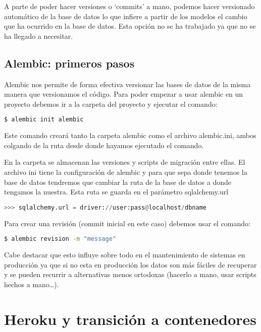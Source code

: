 A parte de poder hacer versiones o `commits' a mano, podemos hacer versionado automático de la base de datos lo que infiere a partir de los modelos el cambio que ha ocurrido en la base de datos. Esta opción no se ha trabajado ya que no se ha llegado a necesitar.

\subsection{Alembic: primeros pasos}

Alembic nos permite de forma efectiva versionar las bases de datos de la misma manera que versionamos el código. Para poder empezar a usar alembic en un proyecto debemos ir a la carpeta del proyecto y ejecutar el comando:

\begin{lstlisting}[language=bash]
  $ alembic init alembic
\end{lstlisting}

Este comando creará tanto la carpeta alembic como el archivo alembic.ini, ambos colgando de la ruta desde donde hayamos ejecutado el comando. 

En la carpeta se almacenan las versiones y scripts de migración entre ellas. El archivo ini tiene la configuración de alembic y para que sepa donde tenemos la base de datos tendremos que cambiar la ruta de la base de datos a donde tengamos la nuestra. Esta ruta se guarda en el parámetro sqlalchemy.url

\begin{lstlisting}[language=python]
  >>> sqlalchemy.url = driver://user:pass@localhost/dbname
\end{lstlisting}



Para crear una revisión (commit inicial en este caso) debemos usar el comando:

\begin{lstlisting}[language=bash]
  $ alembic revision -m "message"
\end{lstlisting}

Cabe destacar que esto influye sobre todo en el mantenimiento de sistemas en producción ya que si no esta en producción los datos son más fáciles de recuperar y se pueden recurrir a alternativas menos ortodoxas (hacerlo a mano, usar scripts hechos a mano\ldots).



\section{Heroku y transición a contenedores}

